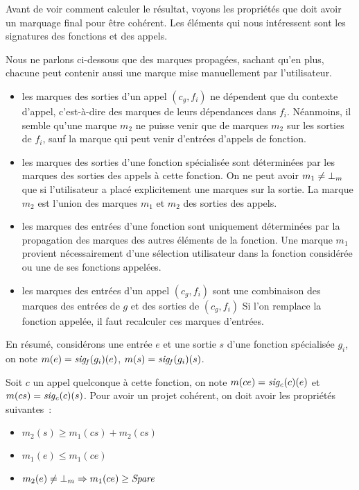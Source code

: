 Avant de voir comment calculer le résultat, voyons les propriétés que doit avoir
un marquage final pour être cohérent.
Les éléments qui nous intéressent sont les signatures des fonctions et des
appels.

Nous ne parlons ci-dessous que des marques propagées,
sachant qu'en plus, chacune peut contenir aussi une marque mise manuellement par
l'utilisateur.

\begin{itemize}
  \item les marques des sorties d'un appel $(c_g, f_i)$ ne dépendent que du
    contexte d'appel, c'est-à-dire des marques de leurs dépendances dans $f_i$.
    Néanmoins, il semble qu'une marque $m_2$ ne puisse venir que de marques
    $m_2$ sur les sorties de $f_i$, sauf la marque \spare{} qui peut venir 
    d'entrées d'appels de fonction.
  \item les marques des sorties d'une fonction spécialisée sont déterminées
    par les marques des sorties des appels à cette fonction.
    On ne peut avoir $m_1 \neq {\bot}_m$ que si l'utilisateur a placé
    explicitement une marques sur la sortie. La marque $m_2$ est l'union 
    des marques $m_1$ et $m_2$ des sorties des appels.
  \item les marques des entrées d'une fonction sont uniquement déterminées par
    la propagation des marques des autres éléments de la fonction.
    Une marque $m_1$ provient nécessairement d'une sélection utilisateur dans la
    fonction considérée ou une de ses fonctions appelées.
  \item les marques des entrées d'un appel $(c_g, f_i)$ sont une combinaison des
    marques des entrées de $g$ et des sorties de $(c_g, f_i)$ 
    Si l'on remplace la fonction appelée, il faut recalculer ces
    marques d'entrées.
\end{itemize}
\bb

En résumé,
considérons une entrée $e$ et une sortie $s$ d'une fonction spécialisée $g_i$,
on note $m(e) = \mathit{sig_f}(g_i)(e)$, $m(s) = \mathit{sig_f}(g_i)(s)$.


Soit $c$ un appel quelconque à cette fonction, 
on note $m(ce) = \mathit{sig_c}(c)(e)$ et $m(cs) = \mathit{sig_c}(c)(s)$.
Pour avoir un projet cohérent, on doit avoir les propriétés suivantes~:


\begin{itemize}
  \item $m_2(s) \geq m_1(cs) + m_2(cs)$
  \item $m_1(e) \leq m_1(ce)$
  \item $m_2(e) \neq {\bot}_m \Rightarrow m_1(ce) \geq \mathit{Spare}$
\end{itemize}

